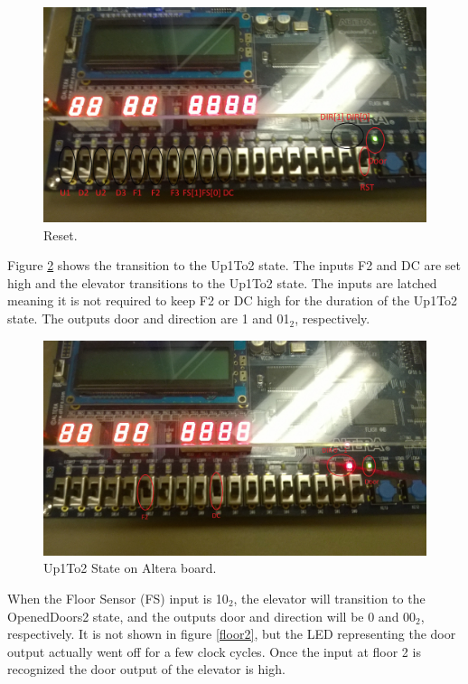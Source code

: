 \documentclass[journal]{IEEEtran}
\begin{document}
\begin{figure}[h]
\centering
\includegraphics[width=0.9\linewidth]{Reset.jpg}
\caption{Reset.}
\label{reset}
\end{figure}

Figure \ref{up1to2} shows the transition to the Up1To2 state. The inputs F2 and DC are set high and the elevator transitions to the Up1To2 state. The inputs are latched meaning it is not required to keep F2 or DC high for the duration of the Up1To2 state. The outputs door and direction are 1 and 01$_{2}$, respectively. 

\begin{figure}[h]
\centering
\includegraphics[width=0.9\linewidth]{Up1To2.jpg}
\caption{Up1To2 State on Altera board.}
\label{up1to2}
\end{figure}

When the Floor Sensor (FS) input is 10$_{2}$, the elevator will transition to the OpenedDoors2 state, and the outputs door and direction will be 0 and 00$_{2}$, respectively. It is not shown in figure \ref{floor2}, but the LED representing the door output actually went off for a few clock cycles. Once the input at floor 2 is recognized the door output of the elevator is high. 
\end{document}

